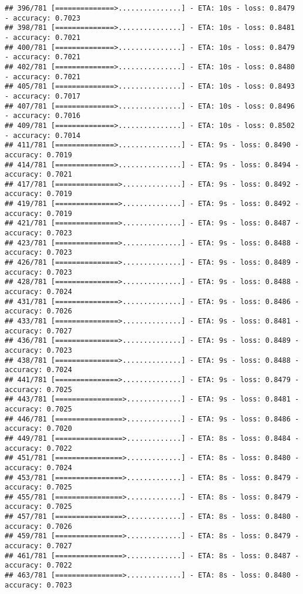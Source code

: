 \documentclass[
]{article}
\begin{document}
\begin{verbatim}
## 396/781 [==============>...............] - ETA: 10s - loss: 0.8479 - accuracy: 0.7023
## 398/781 [==============>...............] - ETA: 10s - loss: 0.8481 - accuracy: 0.7021
## 400/781 [==============>...............] - ETA: 10s - loss: 0.8479 - accuracy: 0.7021
## 402/781 [==============>...............] - ETA: 10s - loss: 0.8480 - accuracy: 0.7021
## 405/781 [==============>...............] - ETA: 10s - loss: 0.8493 - accuracy: 0.7017
## 407/781 [==============>...............] - ETA: 10s - loss: 0.8496 - accuracy: 0.7016
## 409/781 [==============>...............] - ETA: 10s - loss: 0.8502 - accuracy: 0.7014
## 411/781 [==============>...............] - ETA: 9s - loss: 0.8490 - accuracy: 0.7019 
## 414/781 [==============>...............] - ETA: 9s - loss: 0.8494 - accuracy: 0.7021
## 417/781 [===============>..............] - ETA: 9s - loss: 0.8492 - accuracy: 0.7019
## 419/781 [===============>..............] - ETA: 9s - loss: 0.8492 - accuracy: 0.7019
## 421/781 [===============>..............] - ETA: 9s - loss: 0.8487 - accuracy: 0.7023
## 423/781 [===============>..............] - ETA: 9s - loss: 0.8488 - accuracy: 0.7023
## 426/781 [===============>..............] - ETA: 9s - loss: 0.8489 - accuracy: 0.7023
## 428/781 [===============>..............] - ETA: 9s - loss: 0.8488 - accuracy: 0.7024
## 431/781 [===============>..............] - ETA: 9s - loss: 0.8486 - accuracy: 0.7026
## 433/781 [===============>..............] - ETA: 9s - loss: 0.8481 - accuracy: 0.7027
## 436/781 [===============>..............] - ETA: 9s - loss: 0.8489 - accuracy: 0.7023
## 438/781 [===============>..............] - ETA: 9s - loss: 0.8488 - accuracy: 0.7024
## 441/781 [===============>..............] - ETA: 9s - loss: 0.8479 - accuracy: 0.7025
## 443/781 [================>.............] - ETA: 9s - loss: 0.8481 - accuracy: 0.7025
## 446/781 [================>.............] - ETA: 9s - loss: 0.8486 - accuracy: 0.7020
## 449/781 [================>.............] - ETA: 8s - loss: 0.8484 - accuracy: 0.7022
## 451/781 [================>.............] - ETA: 8s - loss: 0.8480 - accuracy: 0.7024
## 453/781 [================>.............] - ETA: 8s - loss: 0.8479 - accuracy: 0.7025
## 455/781 [================>.............] - ETA: 8s - loss: 0.8479 - accuracy: 0.7025
## 457/781 [================>.............] - ETA: 8s - loss: 0.8480 - accuracy: 0.7026
## 459/781 [================>.............] - ETA: 8s - loss: 0.8479 - accuracy: 0.7027
## 461/781 [================>.............] - ETA: 8s - loss: 0.8487 - accuracy: 0.7022
## 463/781 [================>.............] - ETA: 8s - loss: 0.8480 - accuracy: 0.7023

\end{verbatim}
\end{document}
